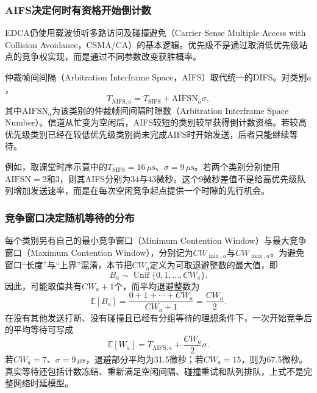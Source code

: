 \subsubsection{AIFS决定何时有资格开始倒计数}

EDCA仍使用载波侦听多路访问及碰撞避免（Carrier Sense Multiple Access with Collision Avoidance，CSMA/CA）的基本逻辑。优先级不是通过取消低优先级站点的竞争权实现，而是通过不同参数改变获胜概率。

仲裁帧间间隔（Arbitration Interframe Space，AIFS）取代统一的DIFS。对类别$a$，
\begin{equation}
T_{\mathrm{AIFS},a}=T_{\mathrm{SIFS}}+\mathrm{AIFSN}_a\sigma,
\end{equation}
其中$\mathrm{AIFSN}_a$为该类别的仲裁帧间间隔时隙数（Arbitration Interframe Space Number）。信道从忙变为空闲后，AIFS较短的类别较早获得倒计数资格。若较高优先级类别已经在较低优先级类别尚未完成AIFS时开始发送，后者只能继续等待。

例如，取课堂时序示意中的$T_{\mathrm{SIFS}}=16\,\mu\mathrm{s}$、$\sigma=9\,\mu\mathrm{s}$。若两个类别分别使用$\mathrm{AIFSN}=2$和3，则其AIFS分别为34与43微秒。这个9微秒差值不是给高优先级队列增加发送速率，而是在每次空闲竞争起点提供一个时隙的先行机会。

\subsubsection{竞争窗口决定随机等待的分布}

每个类别另有自己的最小竞争窗口（Minimum Contention Window）与最大竞争窗口（Maximum Contention Window），分别记为$CW_{\min,a}$与$CW_{\max,a}$。为避免窗口“长度”与“上界”混淆，本节把$CW_a$定义为可取退避整数的最大值，即
\begin{equation}
B_a\sim\operatorname{Unif}\{0,1,\ldots,CW_a\}.
\end{equation}
因此，可能取值共有$CW_a+1$个，而平均退避整数为
\begin{equation}
\mathbb{E}[B_a]=\frac{0+1+\cdots+CW_a}{CW_a+1}=\frac{CW_a}{2}.
\end{equation}
在没有其他发送打断、没有碰撞且已经有分组等待的理想条件下，一次开始竞争后的平均等待可写成
\begin{equation}
\mathbb{E}[W_a]=T_{\mathrm{AIFS},a}+\frac{CW_a}{2}\sigma.
\end{equation}
若$CW_a=7$、$\sigma=9\,\mu\mathrm{s}$，退避部分平均为31.5微秒；若$CW_a=15$，则为67.5微秒。真实等待还包括计数冻结、重新满足空闲间隔、碰撞重试和队列排队，上式不是完整网络时延模型。

